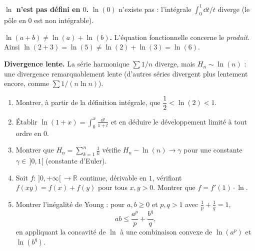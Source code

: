 \vspace{6pt}

\begin{mdframed}[style=cexbar]
  \textbf{$\ln$ n'est pas défini en $0$.}\enspace%
  $\ln(0)$ n'existe pas : l'intégrale $\int_0^1 \dd t/t$ diverge (le pôle en
  $0$ est non intégrable).

  \smallskip\noindent
  \textbf{$\ln(a+b)\neq\ln(a)+\ln(b)$.}\enspace%
  L'équation fonctionnelle concerne le \emph{produit}.
  Ainsi $\ln(2+3)=\ln(5)\neq\ln(2)+\ln(3)=\ln(6)$.

  \smallskip\noindent
  \textbf{Divergence lente.}\enspace%
  La série harmonique $\sum 1/n$ diverge, mais $H_n\sim\ln(n)$ :
  une divergence remarquablement lente (d'autres séries divergent plus
  lentement encore, comme $\sum 1/(n\ln n)$).
\end{mdframed}

\vspace{6pt}
\exolabel

\begin{mdframed}[style=exobar]
  \begin{enumerate}
    \item Montrer, à partir de la définition intégrale, que
          $\dfrac{1}{2} < \ln(2) < 1$.

    \item Établir $\ln(1+x) = \displaystyle\int_0^x\!\frac{\dd t}{1+t}$
          et en déduire le développement limité à tout ordre en $0$.

    \item Montrer que $H_n = \displaystyle\sum_{k=1}^n \frac{1}{k}$
          vérifie $H_n - \ln(n) \to \gamma$ pour une constante
          $\gamma \in\,]0,1[$ (constante d'Euler).

    \item Soit $f :\,]0,+\infty[\,\to\mathbb{R}$ continue, dérivable en $1$,
          vérifiant $f(xy)=f(x)+f(y)$ pour tous $x,y>0$.
          Montrer que $f = f'(1)\cdot\ln$.

    \item Montrer l'inégalité de Young :
          pour $a, b \geq 0$ et $p, q > 1$ avec $\tfrac{1}{p}+\tfrac{1}{q}=1$,
          \[
            ab \leq \frac{a^p}{p} + \frac{b^q}{q},
          \]
          en appliquant la concavité de $\ln$ à une combinaison convexe
          de $\ln(a^p)$ et $\ln(b^q)$.
  \end{enumerate}
\end{mdframed}

